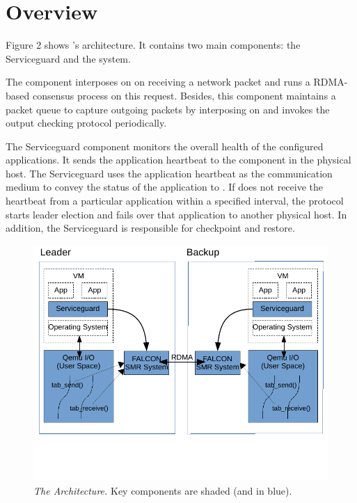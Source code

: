 \section{\xxx Overview} \label{sec:overview}

Figure 2 shows \xxx's architecture. It contains two main components: 
the Serviceguard and the \smrsystem \smr system.

The \smrsystem component interposes on \tapsend on receiving a network packet 
and runs a RDMA-based consensus process on this request. Besides, this component 
maintains a packet queue to capture outgoing packets by interposing on 
\taprecv and invokes the output checking protocol periodically. 

The Serviceguard component monitors the overall health of the configured applications. 
It sends the application heartbeat to the \smrsystem component in the physical 
host. The Serviceguard uses the application heartbeat as the communication 
medium to convey the status of the application to \smrsystem. If \smrsystem does not 
receive the heartbeat from a particular application within a specified interval, 
the protocol starts leader election and fails over that application to another physical 
host. In addition, the Serviceguard is responsible for checkpoint and restore. 

\begin{figure}[t]
\centering
\includegraphics[width=.47\textwidth]{figures/arch}
\vspace{-.2in}
\caption{{\em The \xxx Architecture.} Key components are shaded (and
in blue).} \label{fig:arc}
\vspace{.05in}
\end{figure}
